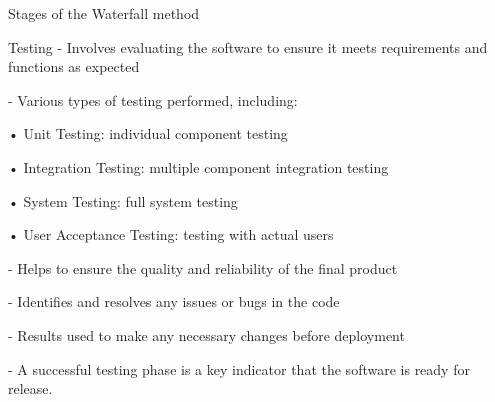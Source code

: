 \begin{frame}{Stages of the Waterfall method}
    \begin{block}{Testing}
        - Involves evaluating the software to ensure it meets requirements and functions as expected
        
        - Various types of testing performed, including:
            
            \hspace*{10mm}• Unit Testing: individual component testing
            
            \hspace*{10mm}• Integration Testing: multiple component integration testing
            
            \hspace*{10mm}• System Testing: full system testing
            
            \hspace*{10mm}• User Acceptance Testing: testing with actual users
        
        - Helps to ensure the quality and reliability of the final product
        
        - Identifies and resolves any issues or bugs in the code
        
        - Results used to make any necessary changes before deployment
        
        - A successful testing phase is a key indicator that the software is ready for release.
    \end{block}   

\end{frame}